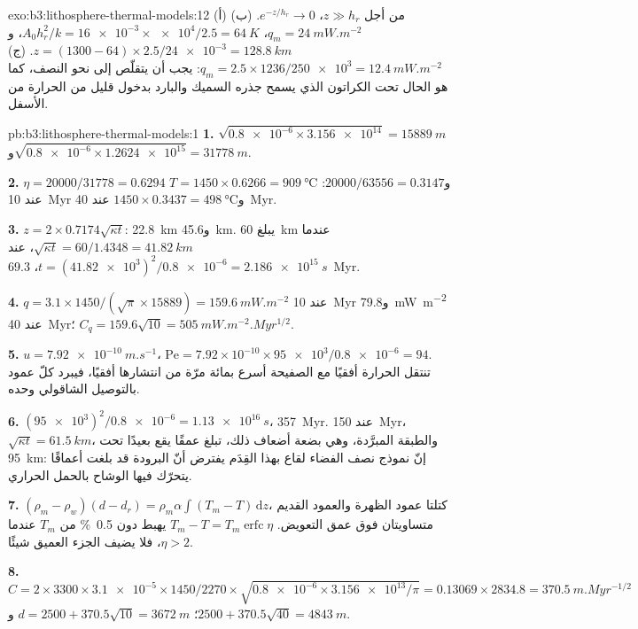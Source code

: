 \begin{solution}{exo:b3:lithosphere-thermal-models:12}
(أ) من أجل $z \gg h_r$، $e^{-z/h_r} \to 0$. (ب) $q_m = \qty{24}{mW.m^{-2}}$،
$A_0h_r^2/k = \num{16e-3}\times\num{e4}/2.5 = \qty{64}{K}$، و$z = (1300 -
64)\times2.5/\num{24e-3} = \qty{128.8}{km}$. (ج) $q_m = 2.5\times1236/\num{250e3}
= \qty{12.4}{mW.m^{-2}}$: يجب أن يتقلّص  إلى نحو النصف، كما هو الحال تحت
الكراتون الذي يسمح جذره السميك والبارد بدخول قليل من الحرارة من الأسفل.
\end{solution}

\begin{solution}{pb:b3:lithosphere-thermal-models:1}
\textbf{1.} $\sqrt{\num{0.8e-6}\times\num{3.156e14}} = \qty{15889}{m}$
و$\sqrt{\num{0.8e-6}\times\num{1.2624e15}} = \qty{31778}{m}$.

\textbf{2.} $\eta = 20000/31778 = 0.6294$ و$20000/63556 = 0.3147$:
$T = 1450\times0.6266 = \qty{909}{\celsius}$ عند \qty{10}{Myr}
و$1450\times0.3437 = \qty{498}{\celsius}$ عند \qty{40}{Myr}.

\textbf{3.} $z = 2\times0.7174\sqrt{\kappa t}$: \qty{22.8}{km}
و\qty{45.6}{km}. يبلغ \qty{60}{km} عندما $\sqrt{\kappa t} = 60/1.4348 =
\qty{41.82}{km}$، عند $t = (\num{41.82e3})^2/\num{0.8e-6} = \qty{2.186e15}{s}$،
\qty{69.3}{Myr}.

\textbf{4.} $q = 3.1\times1450/(\sqrt\pi\times15889) = \qty{159.6}{mW.m^{-2}}$ عند
\qty{10}{Myr} و\qty{79.8}{mW.m^{-2}} عند \qty{40}{Myr}؛ $C_q = 159.6\sqrt{10}
= \qty{505}{mW.m^{-2}.Myr^{1/2}}$.

\textbf{5.} $u = \qty{7.92e-10}{m.s^{-1}}$، $\mathrm{Pe} = 7.92\times10^{-10}
\times\num{95e3}/\num{0.8e-6} = 94$. تنتقل الحرارة أفقيًا مع الصفيحة أسرع
بمائة مرّة من انتشارها أفقيًا، فيبرد كلّ عمود
بالتوصيل الشاقولي وحده.

\textbf{6.} $(\num{95e3})^2/\num{0.8e-6} = \qty{1.13e16}{s}$، \qty{357}{Myr}.
عند \qty{150}{Myr}، $\sqrt{\kappa t} = \qty{61.5}{km}$، والطبقة المبرَّدة، وهي
بضعة أضعاف ذلك، تبلغ عمقًا يقع بعيدًا تحت \qty{95}{km}: إنّ نموذج نصف الفضاء لقاع بهذا القِدَم
يفترض أنّ البرودة قد بلغت أعماقًا يتحرّك فيها الوشاح بالحمل الحراري.

\textbf{7.} $(\rho_m - \rho_w)(d - d_r) = \rho_m\alpha\int(T_m - T)\,\mathrm dz$،
كتلتا عمود الظهرة والعمود القديم متساويتان فوق عمق
التعويض. $T_m - T = T_m\operatorname{erfc}\eta$ يهبط دون
\qty{0.5}{\percent} من $T_m$ عندما $\eta > 2$، فلا يضيف الجزء العميق شيئًا.

\textbf{8.} $C = 2\times3300\times\num{3.1e-5}\times1450/2270\times
\sqrt{\num{0.8e-6}\times\num{3.156e13}/\pi} = 0.13069\times2834.8 =
\qty{370.5}{m.Myr^{-1/2}}$؛ $d = 2500 + 370.5\sqrt{10} = \qty{3672}{m}$
و$2500 + 370.5\sqrt{40} = \qty{4843}{m}$.


\end{solution}
